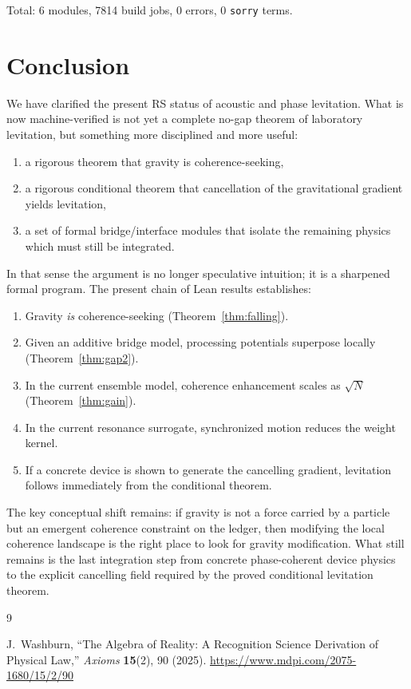 \documentclass[11pt,a4paper]{article}
\begin{document}
\noindent Total: 6 modules, 7814 build jobs, 0 errors, 0 \texttt{sorry} terms.

\section{Conclusion}

We have clarified the present RS status of acoustic and phase levitation.
What is now machine-verified is not yet a complete no-gap theorem of laboratory levitation, but something more disciplined and more useful:
\begin{enumerate}[leftmargin=2em]
    \item a rigorous theorem that gravity is coherence-seeking,
    \item a rigorous conditional theorem that cancellation of the gravitational gradient yields levitation,
    \item a set of formal bridge/interface modules that isolate the remaining physics which must still be integrated.
\end{enumerate}

In that sense the argument is no longer speculative intuition; it is a sharpened formal program.
The present chain of Lean results establishes:
\begin{enumerate}[leftmargin=2em]
    \item Gravity \emph{is} coherence-seeking (Theorem~\ref{thm:falling}).
    \item Given an additive bridge model, processing potentials superpose locally (Theorem~\ref{thm:gap2}).
    \item In the current ensemble model, coherence enhancement scales as $\sqrt{N}$ (Theorem~\ref{thm:gain}).
    \item In the current resonance surrogate, synchronized motion reduces the weight kernel.
    \item If a concrete device is shown to generate the cancelling gradient, levitation follows immediately from the conditional theorem.
\end{enumerate}

The key conceptual shift remains:
if gravity is not a force carried by a particle but an emergent coherence constraint on the ledger, then modifying the local coherence landscape is the right place to look for gravity modification.
What still remains is the last integration step from concrete phase-coherent device physics to the explicit cancelling field required by the proved conditional levitation theorem.

\begin{thebibliography}{9}

J.~Washburn, ``The Algebra of Reality: A Recognition Science Derivation of Physical Law,''
\emph{Axioms} \textbf{15}(2), 90 (2025).
\url{https://www.mdpi.com/2075-1680/15/2/90}

\end{thebibliography}
\end{document}
